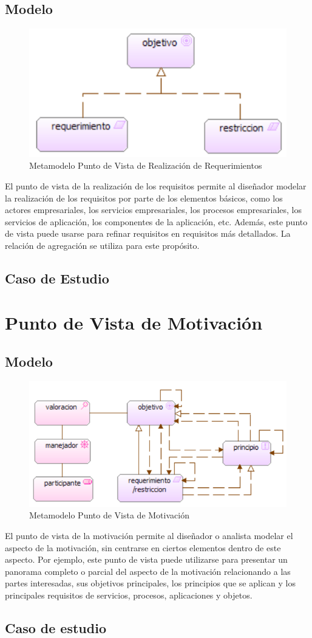 \subsection{Modelo}

\begin{figure}[th!]
	\centering
	\includegraphics[width=0.5\linewidth]{arquitectura/imagenes/modeloRealizacionRequerimientos}
	\caption{Metamodelo Punto de Vista de Realización de Requerimientos}
	\label{metamodelo realizacion requerimientos}
\end{figure}
El punto de vista de la realización de los requisitos permite al diseñador modelar la realización de los requisitos por parte de los elementos básicos, como los actores empresariales, los servicios empresariales, los procesos empresariales, los servicios de aplicación, los componentes de la aplicación, etc.
Además, este punto de vista puede usarse para refinar requisitos en requisitos más detallados. La relación de agregación se utiliza para este propósito.

\subsection{Caso de Estudio}

\newpage

\section{Punto de Vista de Motivación}

\subsection{Modelo}
\begin{figure}[th!]
	\centering
	\includegraphics[width=0.5\linewidth]{arquitectura/imagenes/modeloMotivacion}
	\caption{Metamodelo Punto de Vista de Motivación}
	\label{metamodelo motivacion}
\end{figure}
El punto de vista de la motivación permite al diseñador o analista modelar el aspecto de la motivación, sin centrarse en ciertos elementos dentro de este aspecto. Por ejemplo, este punto de vista puede utilizarse para presentar un panorama completo o parcial del aspecto de la motivación relacionando a las partes interesadas, sus objetivos principales, los principios que se aplican y los principales requisitos de servicios, procesos, aplicaciones y objetos.

\subsection{Caso de estudio}

\newpage

